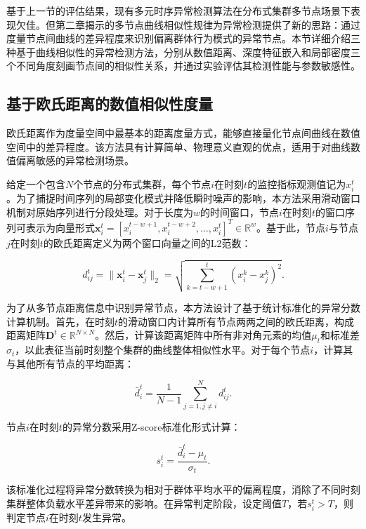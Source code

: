 基于上一节的评估结果，现有多元时序异常检测算法在分布式集群多节点场景下表现欠佳。但第二章揭示的多节点曲线相似性规律为异常检测提供了新的思路：通过度量节点间曲线的差异程度来识别偏离群体行为模式的异常节点。本节详细介绍三种基于曲线相似性的异常检测方法，分别从数值距离、深度特征嵌入和局部密度三个不同角度刻画节点间的相似性关系，并通过实验评估其检测性能与参数敏感性。

\subsection{基于欧氏距离的数值相似性度量}\label{subsec:similarity}

欧氏距离作为度量空间中最基本的距离度量方式，能够直接量化节点间曲线在数值空间中的差异程度。该方法具有计算简单、物理意义直观的优点，适用于对曲线数值偏离敏感的异常检测场景。

给定一个包含$N$个节点的分布式集群，每个节点$i$在时刻$t$的监控指标观测值记为$x_i^t$。为了捕捉时间序列的局部变化模式并降低瞬时噪声的影响，本方法采用滑动窗口机制对原始序列进行分段处理。对于长度为$w$的时间窗口，节点$i$在时刻$t$的窗口序列可表示为向量形式$\mathbf{x}_i^t = [x_i^{t-w+1}, x_i^{t-w+2}, \ldots, x_i^t]^T \in \mathbb{R}^w$。基于此，节点$i$与节点$j$在时刻$t$的欧氏距离定义为两个窗口向量之间的L2范数：

\begin{equation}
    d_{ij}^t = \|\mathbf{x}_i^t - \mathbf{x}_j^t\|_2 = \sqrt{\sum_{k=t-w+1}^{t}(x_i^k - x_j^k)^2}.
\end{equation}

为了从多节点距离信息中识别异常节点，本方法设计了基于统计标准化的异常分数计算机制。首先，在时刻$t$的滑动窗口内计算所有节点两两之间的欧氏距离，构成距离矩阵$\mathbf{D}^t \in \mathbb{R}^{N \times N}$。然后，计算该距离矩阵中所有非对角元素的均值$\mu_t$和标准差$\sigma_t$，以此表征当前时刻整个集群的曲线整体相似性水平。对于每个节点$i$，计算其与其他所有节点的平均距离：

\begin{equation}
    \bar{d}_i^t = \frac{1}{N-1}\sum_{j=1, j \neq i}^{N} d_{ij}^t.
\end{equation}

节点$i$在时刻$t$的异常分数采用Z-score标准化形式计算：

\begin{equation}\label{eq:euc_score}
    s_i^t = \frac{\bar{d}_i^t - \mu_t}{\sigma_t}.
\end{equation}

该标准化过程将异常分数转换为相对于群体平均水平的偏离程度，消除了不同时刻集群整体负载水平差异带来的影响。在异常判定阶段，设定阈值$T$，若$s_i^t > T$，则判定节点$i$在时刻$t$发生异常。

